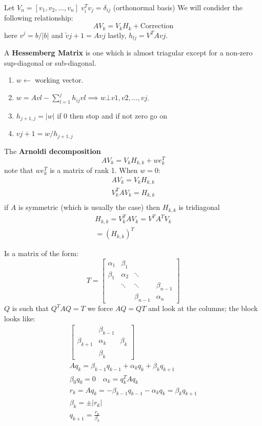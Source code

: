 Let $V_n = [ v_1, v_2, \ldots, v_n ]\; v_i^T v_j = \delta_{ij}$ (orthonormal basis) We will condider the following relationship:
$$AV_k = V_k H_k + \text{Correction}$$
here $v^j = b/|b| $ and $\tilde v\si{j+1} = Av\si{j}$ lastly, $h_{lj}= V^T A v\si{j}$.

\begin{ddef}
A \textbf{Hessemberg Matrix} is one which is almost triagular except for a non-zero sup-diagonal or sub-diagonal.
\begin{enumerate}[(1)]
\item $w\gets $ working vector.
\item $\displaystyle w= Av\si{l} - \sum_{l=1}^j h_{ij} v\si{l} \implies w\bot v\si{1},v\si{2},\ldots, v\si{j}$.
\item $h_{j+1,j} = |w| $ if 0 then stop and if not zero go on
\item $v\si{j+1} = w/h_{j+1,j}$
\end{enumerate}
\end{ddef}

\begin{ddef}
The \textbf{Arnoldi decomposition} 
$$AV_k = V_kH_{k,k} + we^T_k$$
note that $we_k^T$ is  a matrix of rank 1. When $w=0$:
\begin{gather*}
AV_k = V_kH_{k,k}\\
V_k^T A V_k = H_{k,k}\\
\end{gather*}
if $A$ is symmetric (which is usually the case) then $H_{k,k}$ is tridiagonal
\begin{gather*}
H_{k,k}= V^T_k A V_k = V^T A^T V_k\\
= (H_{k,k})^T
\end{gather*}
\end{ddef}

\begin{ddef}
Is a matrix of the form:
$$T=\begin{bmatrix} 
\alpha_1 & \beta_1 &       &\\
\beta_1  & \alpha_2&\ddots &\\
         &\ddots   &\ddots &\beta_{n-1} \\
         &         &\beta_{n-1}&\alpha_n
\end{bmatrix}$$
$Q$ is such that $Q^TAQ = T$ we force $AQ= QT$ and look at the columns; the block looks like:
\begin{gather*}
\begin{bmatrix}
           &\beta_{k-1}&      \\
\beta_{k+1}&\alpha_k   &\beta_k\\
           &\beta_k    &    
\end{bmatrix}\\
Aq_k = \beta_{k-1} q_{k-1} + \alpha_k q_k + \beta_k q_{k+1}\\
\beta_0 q_0 = 0 \quad \alpha_k = q_k^T A q_k\\
r_k = Aq_k = - \beta_{k-1} q_{k-1} - \alpha_k q_k = \beta_k q_{k+1}\\
\beta_k = \pm |r_k|\\
q_{k+1} = \frac{r_k}{\beta_k}
\end{gather*}
\end{ddef}
